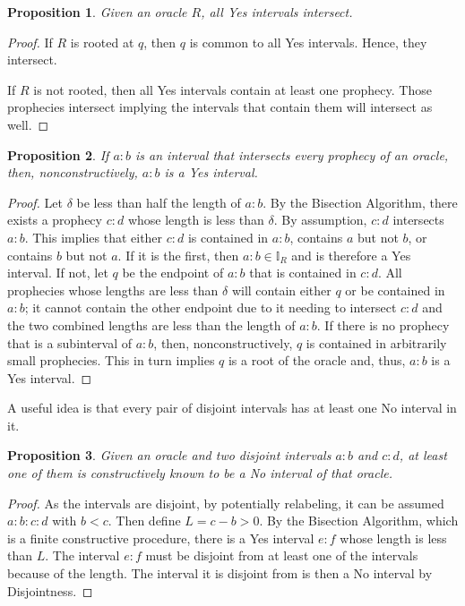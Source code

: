 \documentclass[12pt]{article}
\newtheorem{proposition}{Proposition}[section]
\begin{document}
\begin{proposition}\label{os:yesinter}
    Given an oracle $R$, all Yes intervals intersect. 
\end{proposition}

\begin{proof}
    If $R$ is rooted at $q$, then $q$ is common to all Yes intervals. Hence, they intersect. 

    If $R$ is not rooted, then all Yes intervals contain at least one prophecy. Those prophecies intersect implying the intervals that contain them will intersect as well. 
\end{proof}


\begin{proposition}\label{os:inter}
    If $a:b$ is an interval that intersects every prophecy of an oracle, then, nonconstructively, $a:b$ is a Yes interval. 
\end{proposition}

\begin{proof}
    Let $\delta$ be less than half the length of $a:b$. By the Bisection Algorithm, there exists a prophecy $c:d$ whose length is less than $\delta$. By assumption, $c:d$ intersects $a:b$. This implies that either $c:d$ is contained in $a:b$, contains $a$ but not $b$, or contains $b$ but not $a$. If it is the first, then $a:b \in \mathbb{I}_R$ and is therefore a Yes interval. If not, let $q$ be the endpoint of $a:b$ that is contained in $c:d$. All prophecies whose lengths are less than $\delta$ will contain either $q$ or be contained in $a:b$; it cannot contain the other endpoint due to it needing to intersect $c:d$ and the two combined lengths are less than the length of $a:b$. If there is no prophecy that is a subinterval of $a:b$, then, nonconstructively, $q$ is contained in arbitrarily small prophecies. This in turn implies $q$ is a root of the oracle and, thus, $a:b$ is a Yes interval. 
\end{proof}

A useful idea is that every pair of disjoint intervals has at least one No interval in it. 

\begin{proposition}
    Given an oracle and two disjoint intervals $a:b$ and $c:d$, at least one of them is constructively known to be a No interval of that oracle. 
\end{proposition}

\begin{proof}
    As the intervals are disjoint, by potentially relabeling, it can be assumed $a:b:c:d$ with $b < c$. Then define $L = c-b > 0$. By the Bisection Algorithm, which is a finite constructive procedure, there is a Yes interval $e:f$ whose length is less than $L$. The interval $e:f$ must be disjoint from at least one of the intervals because of the length. The interval it is disjoint from is then a No interval by Disjointness. 
\end{proof}
\end{document}
